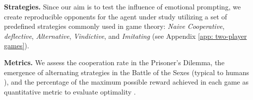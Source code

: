 \documentclass{article}
\begin{document}
\textbf{Strategies.} Since our aim is to test the influence of emotional prompting, we create reproducible opponents for the agent under study utilizing a set of predefined strategies commonly used in game theory: \textit{Naive Cooperative}, \textit{deflective}, \textit{Alternative}, \textit{Vindictive}, and \textit{Imitating} (see Appendix \ref{app: two-player games}).

\textbf{Metrics.} We assess the cooperation rate in the Prisoner's Dilemma, the emergence of alternating strategies in the Battle of the Sexes (typical to humans \cite{jasmRePEc:kap:expeco:v:21:y:2018:i:3:d:10.1007_s10683-018-9568-1, sauRePEc:mos:moswps:2005-04}), and the percentage of the maximum possible reward achieved in each game as quantitative metric to evaluate optimality \cite{akata2023playing}.










\end{document}
